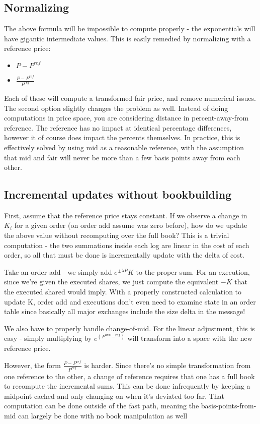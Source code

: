 \documentclass[]{article}
\begin{document}
\subsection{Normalizing}
The above formula will be impossible to compute properly - the exponentials will have gigantic intermediate values. This is easily remedied by normalizing with a reference price:

\begin{itemize}
	\item $P - P^{ref}$
	\item $\frac{P - P^{ref}}{{P^{ref}}}$
\end{itemize}

Each of these will compute a transformed fair price, and remove numerical issues. The second option slightly changes the problem as well. Instead of doing computations in price space, you are considering distance in percent-away-from reference. The reference has no impact at identical percentage differences,
however it of course does impact the percents themselves. In practice, this is effectively solved by using mid as a reasonable reference, with the assumption that mid and fair will never be more than a few basis points away from each other.

\subsection{Incremental updates without bookbuilding}

First, assume that the reference price stays constant. If we observe a change in $K_i$ for a given order (on order add assume was zero before), how do we update the above value without recomputing over the full book? This is a trivial computation - the two summations inside each log are linear in the cost of each order, so all that must be done is incrementally update with the delta of cost.

Take an order add - we simply add $e^{\pm \lambda P} K$ to the proper sum. For an execution, since we're given the executed shares, we just compute the equivalent $-K$ that the executed shared would imply. With a properly constructed calculation to update K, order add and executions don't even need to examine state in an order table since basically all major exchanges include the size delta in the message!

We also have to properly handle change-of-mid. For the linear adjustment, this is easy - simply multiplying by $e^(P^{new}-^{ref})$ will transform into a space with the new reference price.

However, the form $\frac{P - P^{ref}}{{P^{ref}}}$ is harder. Since there's no simple transformation from one reference to the other, a change of reference requires that one has a full book to recompute the incremental sums. This can be done infrequently by keeping a midpoint cached and only changing on when it's deviated too far. That computation can be done outside of the fast path, meaning the basis-points-from-mid can largely be done with no book manipulation as well
\end{document}
